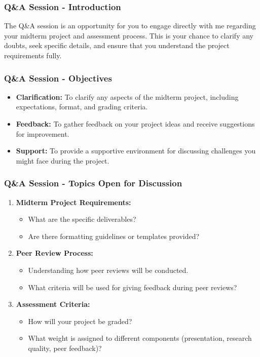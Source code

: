 \documentclass[aspectratio=169]{beamer}
\begin{document}
\begin{frame}[fragile]
    \frametitle{Q\&A Session - Introduction}
    The Q\&A session is an opportunity for you to engage directly with me regarding your midterm project and assessment process. This is your chance to clarify any doubts, seek specific details, and ensure that you understand the project requirements fully.
\end{frame}

\begin{frame}[fragile]
    \frametitle{Q\&A Session - Objectives}
    \begin{itemize}
        \item \textbf{Clarification:} To clarify any aspects of the midterm project, including expectations, format, and grading criteria.
        \item \textbf{Feedback:} To gather feedback on your project ideas and receive suggestions for improvement.
        \item \textbf{Support:} To provide a supportive environment for discussing challenges you might face during the project.
    \end{itemize}
\end{frame}

\begin{frame}[fragile]
    \frametitle{Q\&A Session - Topics Open for Discussion}
    \begin{enumerate}
        \item \textbf{Midterm Project Requirements:}
            \begin{itemize}
                \item What are the specific deliverables?
                \item Are there formatting guidelines or templates provided?
            \end{itemize}
        \item \textbf{Peer Review Process:}
            \begin{itemize}
                \item Understanding how peer reviews will be conducted.
                \item What criteria will be used for giving feedback during peer reviews?
            \end{itemize}
        \item \textbf{Assessment Criteria:}
            \begin{itemize}
                \item How will your project be graded?
                \item What weight is assigned to different components (presentation, research quality, peer feedback)?
            \end{itemize}
    \end{enumerate}
\end{frame}
\end{document}
